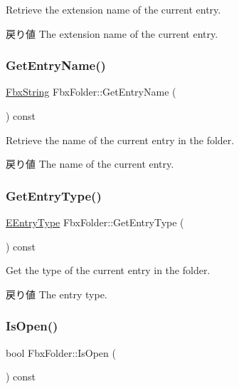 Retrieve the extension name of the current entry. \begin{DoxyReturn}{戻り値}
The extension name of the current entry. 
\end{DoxyReturn}
\mbox{\label{class_fbx_folder_a893ff8805d32ab1c0bf614d07e706c0c}} 
\subsubsection{\texorpdfstring{Get\+Entry\+Name()}{GetEntryName()}}
{\footnotesize\ttfamily \hyperlink{class_fbx_string}{Fbx\+String} Fbx\+Folder\+::\+Get\+Entry\+Name (\begin{DoxyParamCaption}{ }\end{DoxyParamCaption}) const}

Retrieve the name of the current entry in the folder. \begin{DoxyReturn}{戻り値}
The name of the current entry. 
\end{DoxyReturn}
\mbox{\label{class_fbx_folder_a19057a425782659aeeda901f7888f804}} 
\subsubsection{\texorpdfstring{Get\+Entry\+Type()}{GetEntryType()}}
{\footnotesize\ttfamily \hyperlink{class_fbx_folder_aba9ef5b806b138dec254dfe5dedbb719}{E\+Entry\+Type} Fbx\+Folder\+::\+Get\+Entry\+Type (\begin{DoxyParamCaption}{ }\end{DoxyParamCaption}) const}

Get the type of the current entry in the folder. \begin{DoxyReturn}{戻り値}
The entry type. 
\end{DoxyReturn}
\mbox{\label{class_fbx_folder_a350cdc0cd6b8bb625ebb7c4b560f9e45}} 
\subsubsection{\texorpdfstring{Is\+Open()}{IsOpen()}}
{\footnotesize\ttfamily bool Fbx\+Folder\+::\+Is\+Open (\begin{DoxyParamCaption}{ }\end{DoxyParamCaption}) const}

